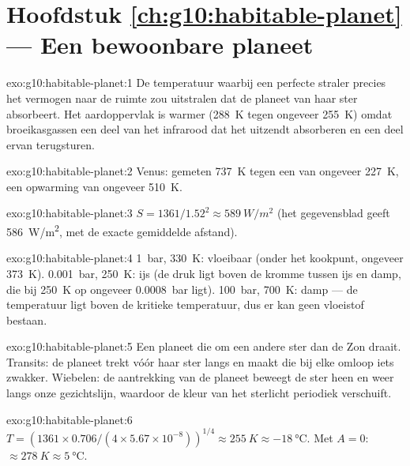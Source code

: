 \section*{Hoofdstuk \ref{ch:g10:habitable-planet} --- Een bewoonbare planeet}

\begin{solution}{exo:g10:habitable-planet:1}
De temperatuur waarbij een perfecte straler precies het vermogen naar de ruimte
zou uitstralen dat de planeet van haar ster absorbeert. Het aardoppervlak is
warmer (\qty{288}{K} tegen ongeveer \qty{255}{K}) omdat broeikasgassen een deel
van het infrarood dat het uitzendt absorberen en een deel ervan terugsturen.
\end{solution}

\begin{solution}{exo:g10:habitable-planet:2}
Venus: gemeten \qty{737}{K} tegen een  van ongeveer
\qty{227}{K}, een opwarming van ongeveer \qty{510}{K}.
\end{solution}

\begin{solution}{exo:g10:habitable-planet:3}
$S = 1361/1.52^2 \approx \qty{589}{W/m^2}$ (het gegevensblad geeft
\qty{586}{W/m^2}, met de exacte gemiddelde afstand).
\end{solution}

\begin{solution}{exo:g10:habitable-planet:4}
\qty{1}{bar}, \qty{330}{K}: vloeibaar (onder het kookpunt, ongeveer
\qty{373}{K}). \qty{0.001}{bar}, \qty{250}{K}: ijs (de druk ligt boven de
kromme tussen ijs en damp, die bij \qty{250}{K} op ongeveer \qty{0.0008}{bar} ligt).
\qty{100}{bar}, \qty{700}{K}: damp --- de temperatuur ligt boven de kritieke
temperatuur, dus er kan geen vloeistof bestaan.
\end{solution}

\begin{solution}{exo:g10:habitable-planet:5}
Een planeet die om een andere ster dan de Zon draait. Transits: de planeet
trekt vóór haar ster langs en maakt die bij elke omloop iets zwakker. Wiebelen:
de aantrekking van de planeet beweegt de ster heen en weer langs onze
gezichtslijn, waardoor de kleur van het sterlicht periodiek verschuift.
\end{solution}

\begin{solution}{exo:g10:habitable-planet:6}
$T = (1361 \times 0.706/(4 \times 5.67\times10^{-8}))^{1/4} \approx
\qty{255}{K} \approx \qty{-18}{\degreeCelsius}$. Met $A = 0$:
$\approx \qty{278}{K} \approx \qty{5}{\degreeCelsius}$.
\end{solution}

